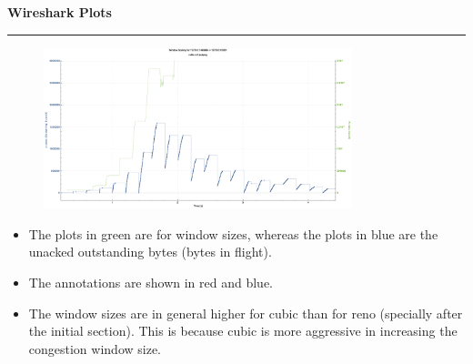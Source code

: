 \documentclass[a4paper,12pt]{article}
\newenvironment{solution}[2][]{%
    \begin{mdframed}[linecolor=blue!70!black, linewidth=2pt, roundcorner=10pt, backgroundcolor=yellow!10!white, skipabove=12pt, skipbelow=12pt]%
        \textbf{\large #2}
        \par\noindent\rule{\textwidth}{0.4pt}
}{
    \end{mdframed}
}
\begin{document}
\begin{solution}{Wireshark Plots}
    \begin{figure}[H]
        \centering
        \includegraphics[width=0.8\textwidth]{cubic-e23.png}
    \end{figure}

    
    \begin{itemize}
        \item The plots in green are for window sizes, whereas the plots in blue are the unacked outstanding bytes (bytes in flight). 
        \item The annotations are shown in red and blue. 
        \item The window sizes are in general higher for cubic than for reno (specially after the initial section). This is because cubic is more aggressive in increasing the congestion window size.
    \end{itemize}
\end{solution}
\end{document}
